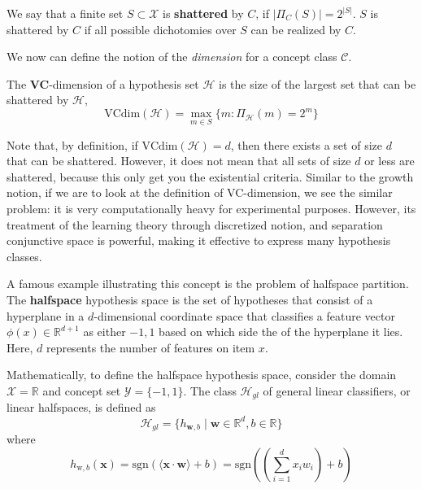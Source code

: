 \begin{definition}[Shattering]
    We say that a finite set $S\subset \mathcal{X}$ is \textbf{shattered} by $C$, if $|\Pi_{C}(S)|=2^{|S|}$. $S$ is shattered by $C$ if all possible dichotomies over $S$ can be realized by $C$. 
\end{definition}

We now can define the notion of the \textit{dimension} for a concept class $\mathcal{C}$. 
\begin{definition}[VC-dimension]
    The \textbf{VC}-dimension of a hypothesis set $\mathcal{H}$ is the size of the largest set that can be shattered by $\mathcal{H}$, 
    \begin{equation}
        \mathrm{VCdim}(\mathcal{H}) = \max_{m\in S} \{m: \Pi_{\mathcal{H}}(m)=2^{m}\}
    \end{equation}
\end{definition}
Note that, by definition, if $\mathrm{VCdim}(\mathcal{H}) =d$, then there exists a set of size $d$ that can be shattered. However, it does not mean that all sets of size $d$ or less are shattered, because this only get you the existential criteria. Similar to the growth notion, if we are to look at the definition of VC-dimension, we see the similar problem: it is very computationally heavy for experimental purposes. However, its treatment of the learning theory through discretized notion, and separation conjunctive space is powerful, making it effective to express many hypothesis classes. 

A famous example illustrating this concept is the problem of halfspace partition. The \textbf{halfspace}  hypothesis space is the set of hypotheses that consist of a hyperplane in a $d$-dimensional coordinate space that classifies a feature vector $\phi(x)\in \mathbb{R}^{d+1}$ as either $-1,1$ based on which side the of the hyperplane it lies. Here, $d$ represents the number of features on item $x$. 

Mathematically, to define the halfspace hypothesis space, consider the domain $\mathcal{X}=\mathbb{R}$ and concept set $\mathcal{Y}=\{-1,1\}$. The class $\mathcal{H}_{gl}$ of general linear classifiers, or linear halfspaces, is defined as 
\begin{equation}
    \mathcal{H}_{gl} = \{ h_{\bm{w},b} \mid \bm{w}\in \mathbb{R}^{d}, b\in \mathbb{R}\}
\end{equation}
where 
\begin{equation}
    h_{\mbox{w},b}(\bm{x}) = \mathrm{sgn}(\langle \bm{x}\cdot \bm{w}\rangle + b) = \mathrm{sgn}\left(\left( \sum^{d}_{i=1} x_{i} w_{i}  \right) +b\right)
\end{equation}

